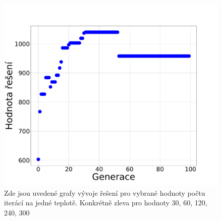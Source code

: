 \documentclass[11pt]{article}
\begin{document}
\begin{figure}
    \begin{minipage}[c]{0.49\textwidth}
        \centering \includegraphics[width=\textwidth]{img/1w.pdf} 
    \end{minipage}
   \caption{Zde jsou uvedené grafy vývoje řešení pro vybrané hodnoty počtu iterácí na jedné teplotě. Konkrétně zleva pro hodnoty 30, 60, 120, 240, 300}\label{fig:GVPT}
\end{figure} 
\end{document}
